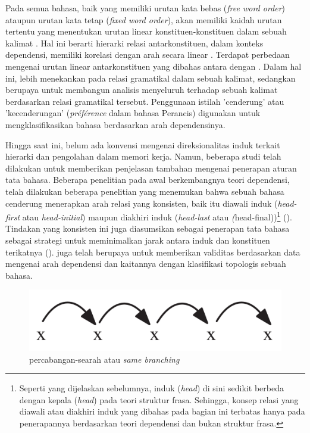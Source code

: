 Pada semua bahasa, baik yang memiliki urutan kata bebas (\textit{free word order}) ataupun urutan kata tetap (\textit{fixed word order}), akan memiliki kaidah urutan tertentu yang menentukan urutan linear konstituen-konstituen dalam sebuah kalimat \citep{tesniere1959elements}. Hal ini berarti hierarki relasi antarkonstituen, dalam konteks dependensi, memiliki korelasi dengan arah secara linear \citep{greenberg1963some}. Terdapat perbedaan mengenai urutan linear antarkonstituen yang dibahas antara \cite{tesniere1959elements} dengan \cite{greenberg1963some}.  Dalam hal ini, \cite{greenberg1963some} lebih menekankan pada relasi gramatikal dalam sebuah kalimat, sedangkan \cite{tesniere1959elements} berupaya untuk membangun analisis menyeluruh terhadap sebuah kalimat berdasarkan relasi gramatikal tersebut. Penggunaan istilah 'cenderung' atau 'kecenderungan' (\textit{pr{\'e}f{\'e}rence} dalam bahasa Perancis) digunakan \cite{tesniere1959elements} untuk mengklasifikasikan bahasa berdasarkan arah dependensinya.

Hingga saat ini, belum ada konvensi mengenai direksionalitas induk terkait hierarki dan pengolahan dalam memori kerja. Namun, beberapa studi telah dilakukan untuk memberikan penjelasan tambahan mengenai penerapan aturan tata bahasa. Beberapa penelitian pada awal berkembangnya teori dependensi, telah dilakukan beberapa penelitian yang menemukan bahwa sebuah bahasa cenderung menerapkan arah relasi yang konsisten, baik itu diawali induk (\textit{head-first} atau \textit{head-initial}) maupun diakhiri induk (\textit{head-last} atau \textit(head-final))\footnote{Seperti yang dijelaskan sebelumnya, induk (\textit{head}) di sini sedikit berbeda dengan kepala (\textit{head}) pada teori struktur frasa. Sehingga, konsep relasi yang diawali atau diakhiri induk yang dibahas pada bagian ini terbatas hanya pada penerapannya berdasarkan teori dependensi dan bukan struktur frasa.} (\citealp{hawkins1994performance, radford1997syntactic, vennemann1994linguistic}). Tindakan yang konsisten ini juga diasumsikan sebagai penerapan tata bahasa sebagai strategi untuk meminimalkan jarak antara induk dan konstituen terikatnya (\citealp{hawkins1994performance, frazier1985syntactic}). \cite{liu2010dependency} juga telah berupaya untuk memberikan validitas berdasarkan data mengenai arah dependensi dan kaitannya dengan klasifikasi topologis sebuah bahasa.

\begin{figure}
	\centering \includegraphics[width=0.5
	\textwidth] {pics/samebranching.png} \caption{\Gls{percabangan-searah} atau \textit{same branching}} 
\label{fig:samebranching} \end{figure}

